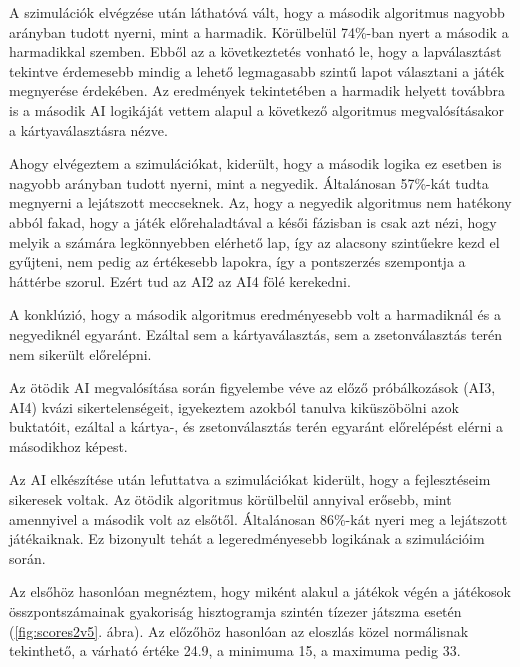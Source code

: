 
A szimulációk elvégzése után láthatóvá vált, hogy a második algoritmus nagyobb arányban tudott nyerni, mint a harmadik. Körülbelül 74\%-ban nyert a második a harmadikkal szemben. Ebből az a következtetés vonható le, hogy a lapválasztást tekintve érdemesebb mindig a lehető legmagasabb szintű lapot választani a játék megnyerése érdekében. Az eredmények tekintetében a harmadik helyett továbbra is a második AI logikáját vettem alapul a következő algoritmus megvalósításakor a kártyaválasztásra nézve.


Ahogy elvégeztem a szimulációkat, kiderült, hogy a második logika ez esetben is nagyobb arányban tudott nyerni, mint a negyedik. Általánosan 57\%-kát tudta megnyerni a lejátszott meccseknek. Az, hogy a negyedik algoritmus nem hatékony abból fakad, hogy a játék előrehaladtával a késői fázisban is csak azt nézi, hogy melyik a számára legkönnyebben elérhető lap, így az alacsony szintűekre kezd el gyűjteni, nem pedig az értékesebb lapokra, így a pontszerzés szempontja a háttérbe szorul. Ezért tud az AI2 az AI4 fölé kerekedni.

A konklúzió, hogy a második algoritmus eredményesebb volt a harmadiknál és a negyediknél egyaránt. Ezáltal sem a kártyaválasztás, sem a zsetonválasztás terén nem sikerült előrelépni.


Az ötödik AI megvalósítása során figyelembe véve az előző próbálkozások (AI3, AI4) kvázi sikertelenségeit, igyekeztem azokból tanulva kiküszöbölni azok buktatóit, ezáltal a kártya-, és zsetonválasztás terén egyaránt előrelépést elérni a másodikhoz képest.

Az AI elkészítése után lefuttatva a szimulációkat kiderült, hogy a fejlesztéseim sikeresek voltak.
Az ötödik algoritmus körülbelül annyival erősebb, mint amennyivel a második volt az elsőtől. Általánosan 86\%-kát nyeri meg a lejátszott játékaiknak. Ez bizonyult tehát a legeredményesebb logikának a szimulációim során.

Az elsőhöz hasonlóan megnéztem, hogy miként alakul a játékok végén a játékosok összpontszámainak gyakoriság hisztogramja szintén tízezer játszma esetén (\ref{fig:scores2v5}. ábra). Az előzőhöz hasonlóan az eloszlás közel normálisnak tekinthető, a várható értéke 24.9, a minimuma 15, a maximuma pedig 33.

